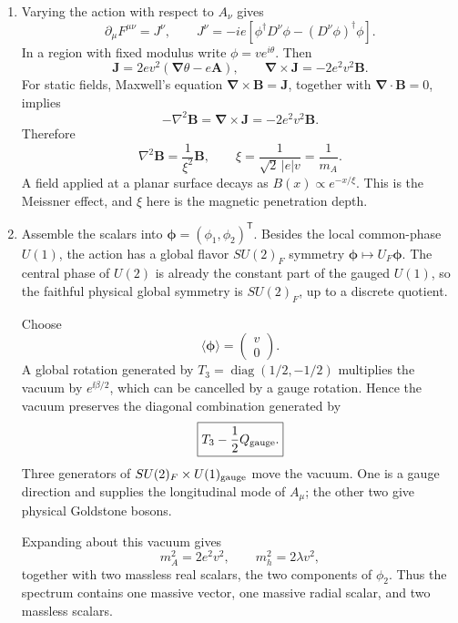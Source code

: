 \begin{enumerate}
\begin{enumerate}
    \item[(ii)]
    Varying the action with respect to \(A_\nu\) gives
    \[
      \partial_\mu F^{\mu\nu}=J^\nu,\qquad
      \boxed{J^\nu=-ie\left[
        \phi^\dagger D^\nu\phi-(D^\nu\phi)^\dagger\phi\right].}
    \]
    In a region with fixed modulus write \(\phi=ve^{i\theta}\).  Then
    \[
      \mathbf J=2ev^2(\boldsymbol\nabla\theta-e\mathbf A),
      \qquad
      \boldsymbol\nabla\times\mathbf J=-2e^2v^2\mathbf B.
    \]
    For static fields, Maxwell's equation
    \(\boldsymbol\nabla\times\mathbf B=\mathbf J\), together with
    \(\boldsymbol\nabla\cdot\mathbf B=0\), implies
    \[
      -\nabla^2\mathbf B
        =\boldsymbol\nabla\times\mathbf J
        =-2e^2v^2\mathbf B.
    \]
    Therefore
    \[
      \boxed{\nabla^2\mathbf B=\frac1{\xi^2}\mathbf B,\qquad
        \xi=\frac1{\sqrt2\,|e|v}=\frac1{m_A}.}
    \]
    A field applied at a planar surface decays as
    \(B(x)\propto e^{-x/\xi}\).  This is the Meissner effect, and
    \(\xi\) here is the magnetic penetration depth.

    \item[(iii)]
    Assemble the scalars into
    \(\boldsymbol\phi=(\phi_1,\phi_2)^{\mathsf T}\).  Besides the local
    common-phase \(U(1)\), the action has a global flavor
    \(SU(2)_F\) symmetry
    \(\boldsymbol\phi\mapsto U_F\boldsymbol\phi\).  The central phase of
    \(U(2)\) is already the constant part of the gauged \(U(1)\), so the
    faithful physical global symmetry is \(SU(2)_F\), up to a discrete
    quotient.

    Choose
    \[
      \langle\boldsymbol\phi\rangle=
        \begin{pmatrix}v\\0\end{pmatrix}.
    \]
    A global rotation generated by
    \(T_3=\operatorname{diag}(1/2,-1/2)\) multiplies the vacuum by
    \(e^{\ii\beta/2}\), which can be cancelled by a gauge rotation.
    Hence the vacuum preserves the diagonal combination generated by
    \[
      \boxed{T_3-\frac12Q_{\rm gauge}.}
    \]
    Three generators of \(SU(2)_F\times U(1)_{\rm gauge}\) move the
    vacuum.  One is a gauge direction and supplies the longitudinal mode
    of \(A_\mu\); the other two give physical Goldstone bosons.

    Expanding about this vacuum gives
    \[
      \boxed{m_A^2=2e^2v^2,\qquad
        m_h^2=2\lambda v^2,}
    \]
    together with two massless real scalars, the two components of
    \(\phi_2\).  Thus the spectrum contains one massive vector, one
    massive radial scalar, and two massless scalars.


\end{enumerate}
\end{enumerate}
